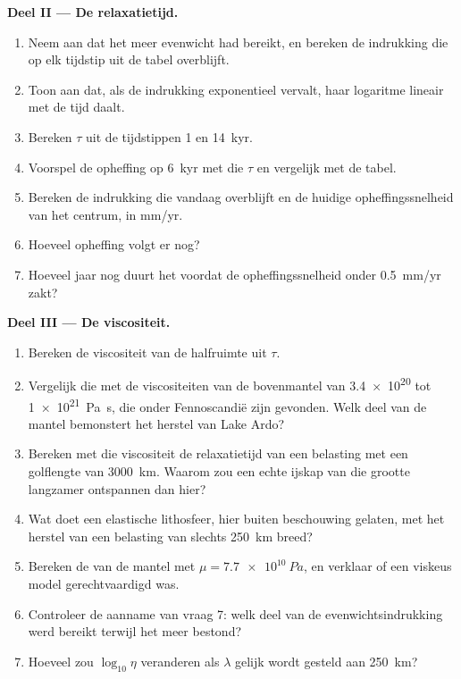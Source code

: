 \begin{problem}
\medskip\noindent\textbf{Deel II --- De relaxatietijd.}
\begin{enumerate}[resume]
  \item Neem aan dat het meer evenwicht had bereikt, en bereken de indrukking die
        op elk tijdstip uit de tabel overblijft.
  \item Toon aan dat, als de indrukking exponentieel vervalt, haar logaritme
        lineair met de tijd daalt.
  \item Bereken $\tau$ uit de tijdstippen 1 en \qty{14}{kyr}.
  \item Voorspel de opheffing op \qty{6}{kyr} met die $\tau$ en vergelijk met de
        tabel.
  \item Bereken de indrukking die vandaag overblijft en de huidige opheffingssnelheid van het
        centrum, in \unit{mm/yr}.
  \item Hoeveel opheffing volgt er nog?
  \item Hoeveel jaar nog duurt het voordat de opheffingssnelheid onder
        \qty{0.5}{mm/yr} zakt?
\end{enumerate}

\medskip\noindent\textbf{Deel III --- De viscositeit.}
\begin{enumerate}[resume]
  \item Bereken de viscositeit van de halfruimte uit $\tau$.
  \item Vergelijk die met de viscositeiten van de bovenmantel van \num{3.4e20} tot
        \qty{1e21}{Pa.s}, die onder Fennoscandië zijn gevonden. Welk deel van de mantel
        bemonstert het herstel van Lake Ardo?
  \item Bereken met die viscositeit de relaxatietijd van een belasting
        met een golflengte van \qty{3000}{km}. Waarom zou een echte ijskap van die grootte
        langzamer ontspannen dan hier?
  \item Wat doet een elastische lithosfeer, hier buiten beschouwing gelaten, met het herstel van een
        belasting van slechts \qty{250}{km} breed?
  \item Bereken de  van de mantel met $\mu = \qty{7.7e10}{Pa}$,
        en verklaar of een viskeus model gerechtvaardigd was.
  \item Controleer de aanname van vraag 7: welk deel van de evenwichtsindrukking
        werd bereikt terwijl het meer bestond?
  \item Hoeveel zou $\log_{10}\eta$ veranderen als $\lambda$ gelijk wordt gesteld aan
        \qty{250}{km}?
\end{enumerate}


\end{problem}
